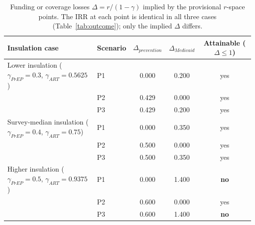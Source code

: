 \begin{table}[htbp]\centering\small
\begin{tabular}{llccc}\toprule
Insulation case & Scenario & $\Delta_{prevention}$ & $\Delta_{Medicaid}$ & Attainable ($\Delta\leq1$)\\\midrule
Lower insulation ($\gamma_{PrEP}=0.3$, $\gamma_{ART}=0.5625$) & P1 & 0.000 & 0.200 & yes\\
 & P2 & 0.429 & 0.000 & yes\\
 & P3 & 0.429 & 0.200 & yes\\
\midrule
Survey-median insulation ($\gamma_{PrEP}=0.4$, $\gamma_{ART}=0.75$) & P1 & 0.000 & 0.350 & yes\\
 & P2 & 0.500 & 0.000 & yes\\
 & P3 & 0.500 & 0.350 & yes\\
\midrule
Higher insulation ($\gamma_{PrEP}=0.5$, $\gamma_{ART}=0.9375$) & P1 & 0.000 & 1.400 & \textbf{no}\\
 & P2 & 0.600 & 0.000 & yes\\
 & P3 & 0.600 & 1.400 & \textbf{no}\\
\bottomrule\end{tabular}\caption{Funding or coverage losses $\Delta=r/(1-\gamma)$ implied by the provisional $r$-space points. The IRR at each point is identical in all three cases (Table~\ref{tab:outcome}); only the implied $\Delta$ differs.}\label{tab:mapping}\end{table}
